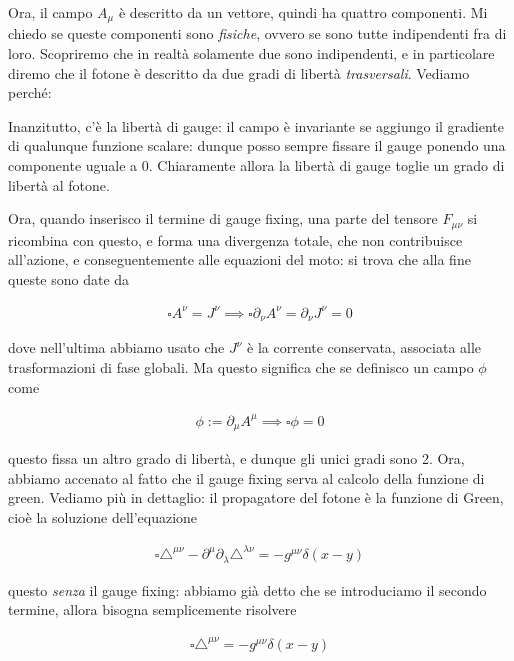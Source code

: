 \documentclass[11pt]{report}
\begin{document}
Ora, il campo \(A_\mu\) è descritto da un vettore, quindi ha quattro componenti. Mi chiedo se queste componenti sono \emph{fisiche}, ovvero se sono tutte indipendenti fra di loro. Scopriremo che in realtà solamente due sono indipendenti, e in particolare diremo che il fotone è descritto da due gradi di libertà \emph{trasversali}. Vediamo perché: 

Inanzitutto, c'è la libertà di gauge: il campo è invariante se aggiungo il gradiente di qualunque funzione scalare: dunque posso sempre fissare il gauge ponendo una componente uguale a 0. Chiaramente allora la libertà di gauge toglie un grado di libertà al fotone. 

Ora, quando inserisco il termine di gauge fixing, una parte del tensore \(F_{\mu\nu}\) si ricombina con questo, e forma una divergenza totale, che non contribuisce all'azione, e conseguentemente alle equazioni del moto: si trova che alla fine queste sono date da 

\begin{align}
    \square A^\nu = J^\nu \implies \square \partial_\nu A^\nu = \partial_\nu J^\nu = 0
\end{align}

dove nell'ultima abbiamo usato che \(J^\nu\) è la corrente conservata, associata alle trasformazioni di fase globali. Ma questo significa che se definisco un campo \(\phi\) come 

\begin{align}
    \phi := \partial_\mu A^\mu \implies \square\phi = 0
\end{align}

questo fissa un altro grado di libertà, e dunque gli unici gradi sono 2. Ora, abbiamo accenato al fatto che il gauge fixing serva al calcolo della funzione di green. Vediamo più in dettaglio: il propagatore del fotone è la funzione di Green, cioè la soluzione dell'equazione 

\begin{align}
    \square \triangle^{\mu\nu} - \partial^\mu\partial_\lambda \triangle^{\lambda\nu} = -g^{\mu\nu}\delta(x-y)
\end{align}

questo \emph{senza} il gauge fixing: abbiamo già detto che se introduciamo il secondo termine, allora bisogna semplicemente risolvere 

\begin{align}
    \square \triangle^{\mu\nu} = -g^{\mu\nu}\delta(x-y)
\end{align}
\end{document}
